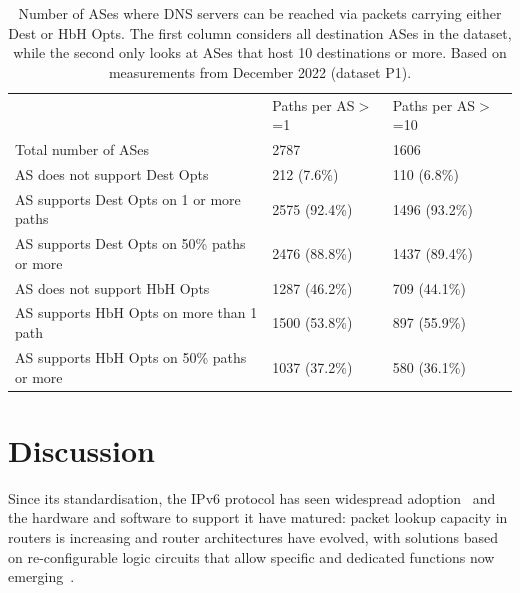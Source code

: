 \documentclass[conference]{IEEEtran}
\begin{document}
    \begin{table}[]
\begin{tabular}{p{}|p{}p{}}
                                          & Paths per AS$>$=1 & Paths per AS$>$=10 \\ \cline{1-3} 
Total number of ASes                      & 2787                                            & 1606                                            \\ \hline
AS does not support Dest Opts               & 212 (7.6\%)                                     & 110 (6.8\%)                                     \\
AS supports Dest Opts on 1 or more paths   & 2575 (92.4\%)                                   & 1496 (93.2\%)                                   \\
AS supports Dest Opts on 50\% paths or more & 2476  (88.8\%)                                  & 1437 (89.4\%)                                   \\ \hline
AS does not support HbH Opts               & 1287 (46.2\%)                                   & 709 (44.1\%)                                    \\
AS supports HbH Opts on more than 1 path   & 1500 (53.8\%)                                   & 897 (55.9\%)                                    \\
AS supports HbH Opts on 50\% paths or more & 1037 (37.2\%)                                   & 580 (36.1\%)                                   
\end{tabular}
\label{tbl:as_pathspider}
\caption{Number of ASes where DNS servers can be reached via packets carrying either Dest or HbH Opts. The first column considers all destination ASes in the dataset, while the second only looks at ASes that host 10 destinations or more. Based on measurements from December 2022 (dataset P1).}
\end{table}

\section{Discussion} 
\label{sec:discussion}

Since its standardisation, the IPv6 protocol has
seen widespread adoption~\cite{v6adoption_ton} and the hardware and software to
support it have matured: packet lookup capacity in routers is increasing and
router architectures have evolved, with solutions based on re-configurable
logic circuits that allow specific and dedicated functions now
emerging~\cite{cisco-silicon-one}.
\end{document}
